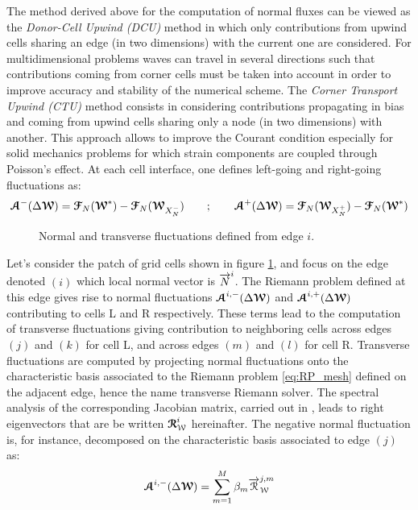 The method derived above for the computation of normal fluxes can be viewed as the \textit{Donor-Cell Upwind (DCU)} method \cite{Leveque} in which only contributions from upwind cells sharing an edge (in two dimensions) with the current one are considered. For multidimensional problems waves can travel in several directions such that contributions coming from corner cells must be taken into account in order to improve accuracy and stability of the numerical scheme. The \textit{Corner Transport Upwind (CTU)} method \cite{Colella_CTU} consists in considering contributions propagating in bias and coming from upwind cells sharing only a node (in two dimensions) with another. This approach allows to improve the Courant condition especially for solid mechanics problems for which strain components are coupled through Poisson's effect. At each cell interface, one defines left-going and right-going fluctuations as:
\begin{equation}
  {\boldsymbol{\mathcal{A}}}^-(\Delta {\boldsymbol{\mathcal{W}}}) = {\boldsymbol{\mathcal{F}}}_N({\boldsymbol{\mathcal{W}}}^*) - {\boldsymbol{\mathcal{F}}}_N({\boldsymbol{\mathcal{W}}}_{X_N^-}) \qquad ;  \qquad {\boldsymbol{\mathcal{A}}}^+(\Delta {\boldsymbol{\mathcal{W}}}) = {\boldsymbol{\mathcal{F}}}_N({\boldsymbol{\mathcal{W}}}_{X_N^+})-{\boldsymbol{\mathcal{F}}}_N({\boldsymbol{\mathcal{W}}}^*) 
\end{equation}
\begin{figure}[h!]
  \centering
  
  \caption{Normal and transverse fluctuations defined from edge $i$.}
  \label{fig:CTU}
\end{figure}
Let's consider the patch of grid cells shown in figure \ref{fig:CTU}, and focus on the edge denoted $(i)$ which local normal vector is ${\overrightarrow{N}}^i$. The Riemann problem defined at this edge gives rise to normal fluctuations ${\boldsymbol{\mathcal{A}}}^{i,-}(\Delta {\boldsymbol{\mathcal{W}}})$ and ${\boldsymbol{\mathcal{A}}}^{i,+}(\Delta {\boldsymbol{\mathcal{W}}})$ contributing to cells L and R respectively. These terms lead to the computation of transverse fluctuations giving contribution to neighboring cells across edges $(j)$ and $(k)$ for cell L, and across edges $(m)$ and $(l)$ for cell R. Transverse fluctuations are computed by projecting normal fluctuations onto the characteristic basis associated to the Riemann problem \eqref{eq:RP_mesh} defined on the adjacent edge, hence the name transverse Riemann solver. The spectral analysis of the corresponding Jacobian matrix, carried out in \cite{Kluth}, leads to right eigenvectors that are be written ${\boldsymbol{\mathcal{R}}}_{\mathcal{W}}^i$ hereinafter. The negative normal fluctuation is, for instance, decomposed on the characteristic basis associated to edge $(j)$ as:
\begin{equation}
{\boldsymbol{\mathcal{A}}}^{i,-}(\Delta {\boldsymbol{\mathcal{W}}}) = \sum_{m=1}^{M} \beta_m {\overrightarrow{\mathcal{R}}}^{j,m}_{\mathcal{W}}
\end{equation}
